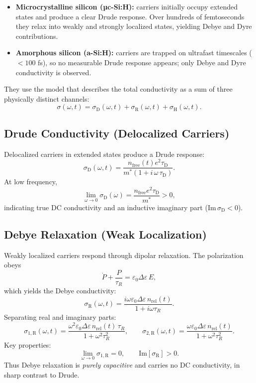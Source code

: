 \begin{itemize}
\item \textbf{Microcrystalline silicon (µc-Si:H):}
      carriers initially occupy extended states and produce a clear 
      Drude response. Over hundreds of femtoseconds they relax into 
      weakly and strongly localized states, yielding Debye and Dyre
      contributions.
\item \textbf{Amorphous silicon (a-Si:H):}
      carriers are trapped on ultrafast timescales (\(< 100\) fs), so
      no measurable Drude response appears; only Debye and Dyre
      conductivity is observed.
\end{itemize}

They use the model that describes the total conductivity as a sum of three physically distinct
channels:
\[
\sigma(\omega,t)
=
\sigma_{\mathrm{D}}(\omega,t)
+
\sigma_{\mathrm{R}}(\omega,t)
+
\sigma_{\mathrm{H}}(\omega,t).
\]


\subsection{Drude Conductivity (Delocalized Carriers)}

Delocalized carriers in extended states produce a Drude response:
\[
\sigma_{\mathrm{D}}(\omega,t)
=
\frac{ n_{\mathrm{free}}(t) e^2 \tau_{\mathrm{D}} }
     { m^\ast \left( 1 + i \, \omega \, \tau_{\mathrm{D}} \right) }.
\]
At low frequency,
\[
\lim_{\omega\to 0} \sigma_{\mathrm{D}}(\omega) = 
\frac{n_{\mathrm{free}} e^2\tau_{\mathrm{D}}}{m^\ast} > 0,
\]
indicating true DC conductivity and an inductive imaginary part
(\(\mathrm{Im}\,\sigma_{\mathrm{D}} < 0\)).


\subsection{Debye Relaxation (Weak Localization)}

Weakly localized carriers respond through dipolar relaxation. The
polarization obeys
\[
\dot{P} + \frac{P}{\tau_R} = \varepsilon_0 \Delta\varepsilon \, E,
\]
which yields the Debye conductivity:
\[
\sigma_{\mathrm{R}}(\omega,t)
=
\frac{i \omega \varepsilon_0 \Delta\varepsilon\, n_{\mathrm{rel}}(t)}
     {1 + i\omega \tau_R } .
\]
Separating real and imaginary parts:
\[
\sigma_{1,\mathrm{R}}(\omega,t)
=
\frac{ \omega^2 \varepsilon_0 \Delta\varepsilon\, n_{\mathrm{rel}}(t)\, \tau_R }
     { 1 + \omega^2 \tau_R^2 },
\qquad
\sigma_{2,\mathrm{R}}(\omega,t)
=
\frac{ \omega \varepsilon_0 \Delta\varepsilon\, n_{\mathrm{rel}}(t) }
     { 1 + \omega^2 \tau_R^2 } .
\]
Key properties:
\[
\lim_{\omega\to 0} \sigma_{1,\mathrm{R}} = 0,
\qquad
\mathrm{Im}[\sigma_{\mathrm{R}}] > 0.
\]
Thus Debye relaxation is \emph{purely capacitive} and carries no DC
conductivity, in sharp contrast to Drude.


